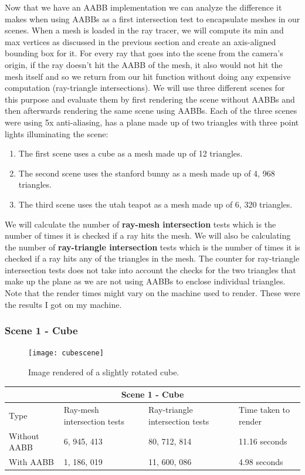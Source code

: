 \documentclass[11pt,a4paper]{article}
\begin{document}
	Now that we have an AABB implementation we can analyze the difference it makes when using AABBs as a first intersection test to encapsulate meshes in our scenes. When a mesh is loaded in the ray tracer, we will compute its min and max vertices as discussed in the previous section and create an axis-aligned bounding box for it. For every ray that goes into the scene from the camera's origin, if the ray doesn't hit the AABB of the mesh, it also would not hit the mesh itself and so we return from our hit function without doing any expensive computation (ray-triangle intersections). We will use three different scenes for this purpose and evaluate them by first rendering the scene without AABBs and then afterwards rendering the same scene using AABBs. Each of the three scenes were using 5x anti-aliasing, has a plane made up of two triangles with three point lights illuminating the scene:
	\begin{enumerate}
		\item The first scene uses a cube as a mesh made up of 12 triangles.
		\item The second scene uses the stanford bunny \cite{stanfordbunny} as a mesh made up of 4, 968 triangles.
		\item The third scene uses the utah teapot \cite{utahteapot} as a mesh made up of 6, 320 triangles.
	\end{enumerate}
	We will calculate the number of \textbf{ray-mesh intersection} tests which is the number of times it is checked if a ray hits the mesh. We will also be calculating the number of \textbf{ray-triangle intersection} tests which is the number of times it is checked if a ray hits any of the triangles in the mesh. The counter for ray-triangle intersection tests does not take into account the checks for the two triangles that make up the plane as we are not using AABBs to enclose individual triangles. Note that the render times might vary on the machine used to render. These were the results I got on my machine.
	\subsubsection{Scene 1 - Cube}
	\begin{figure}[H]
		\centering
		\captionsetup{justification=centering}
		\texttt{[image: cubescene]}\quad
		\caption{Image rendered of a slightly rotated cube.}
	\end{figure}
	
	\begin{table}[h]
		\centering
		\begin{tabular}{ |p{3cm}||p{3cm}|p{3cm}|p{3cm}|  }
			\hline
			\multicolumn{4}{|c|}{Scene 1 - Cube} \\
			\hline
			Type   &   Ray-mesh intersection tests  & Ray-triangle intersection tests &   Time taken to render\\
			\hline
			Without AABB   & 6, 945, 413    &80, 712, 814&   11.16 seconds\\
			With AABB&   1, 186, 019  &11, 600, 086   &      4.98 seconds\\
			\hline
		\end{tabular}
	\end{table}
	
\end{document}
